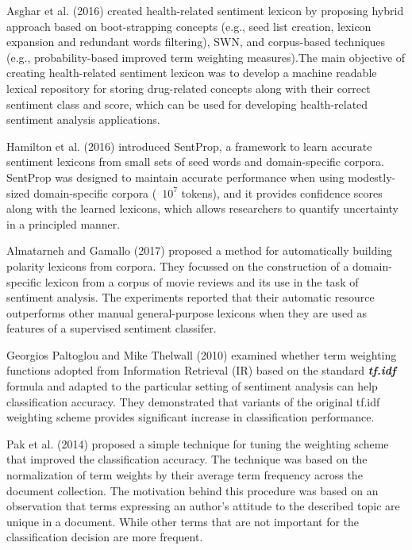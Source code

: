 \documentclass[conference]{IEEEtran}
\begin{document}
Asghar et al.
(2016) \cite{c2} created health-related sentiment lexicon by
proposing hybrid approach based on boot-strapping concepts (e.g., seed list creation,
lexicon expansion and redundant words filtering), SWN, and corpus-based techniques
(e.g., probability-based improved term weighting measures).The main objective of creating health-related sentiment lexicon was to develop a
machine readable lexical repository for storing drug-related concepts along with their
correct sentiment class and score, which can be used for developing health-related sentiment
analysis applications.

Hamilton et al. (2016) \cite{c3} introduced SentProp, a framework to learn accurate sentiment lexicons from small sets of seed words and domain-specific corpora. SentProp was designed to maintain accurate performance when using modestly-sized domain-specific corpora (~$ 10^{7} $ tokens), and it provides confidence scores along with the learned lexicons, which allows researchers to quantify uncertainty in a principled manner.

Almatarneh and Gamallo (2017) \cite{c4} proposed a method for automatically building polarity lexicons
from corpora. They focussed on the construction of a domain-specific
lexicon from a corpus of movie reviews and its use in the task of sentiment
analysis. The experiments reported   that their automatic
resource outperforms other manual general-purpose lexicons when they are used
as features of a supervised sentiment classifer.    

Georgios Paltoglou and Mike Thelwall (2010) \cite{c5}  examined whether term weighting
functions adopted from Information Retrieval
(IR) based on the standard \textbf{\textit{tf.idf}} formula and
adapted to the particular setting of sentiment analysis
can help classification accuracy. They demonstrated
that variants of the original tf.idf weighting
scheme provides significant increase in classification
performance.


Pak et al. (2014) \cite{c6} proposed a simple technique for tuning the weighting scheme that
improved the classification accuracy. The technique was based on the normalization of
term weights by their average term frequency across the document collection. The motivation
behind this procedure was based on an observation that terms expressing an author’s
attitude to the described topic are unique in a document. While other terms that
are not important for the classification decision are more frequent.    
\end{document}
